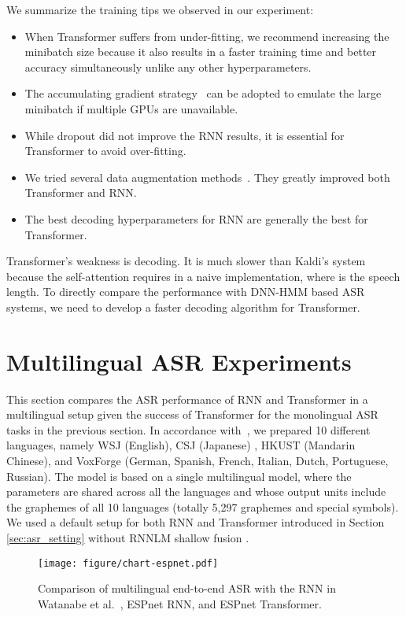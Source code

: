 We summarize the training tips we observed in our experiment:
{
\setlength{\leftmargini}{15pt}  
\begin{itemize}
	\setlength{\itemsep}{1pt}      \setlength{\parskip}{0pt}      \setlength{\itemindent}{0pt}   \setlength{\labelsep}{4pt}     \item When Transformer suffers from under-fitting, we recommend increasing the minibatch size because it also results in a faster training time and better accuracy simultaneously unlike any other hyperparameters.
    \item The accumulating gradient strategy~\cite{ott-etal-2018-scaling} can be adopted to emulate the large minibatch if multiple GPUs are unavailable.
\item While dropout did not improve the RNN results, it is essential for Transformer to avoid over-fitting.
    \item We tried several data augmentation methods~\cite{ko2015audio,park2019specaugment}. They greatly improved both Transformer and RNN.
\item The best decoding hyperparameters  for RNN are generally the best for Transformer.
\end{itemize}
}
Transformer's weakness is decoding. It is much slower than Kaldi's system because the self-attention requires  in a naive implementation, where  is the speech length. To directly compare the performance with DNN-HMM based ASR systems, we need to develop a faster decoding algorithm for Transformer.


\section{Multilingual ASR Experiments}
This section compares the ASR performance of RNN and Transformer in a multilingual setup given the success of Transformer for the monolingual ASR tasks in the previous section.
In accordance with~\cite{watanabe2017language}, we prepared 10 different languages, namely WSJ (English), CSJ (Japanese) \cite{CSJ-L00-1200}, HKUST \cite{hkust} (Mandarin Chinese), and VoxForge (German, Spanish, French, Italian, Dutch, Portuguese, Russian).
The model is based on a single multilingual model,  where the parameters
are shared across all the languages and whose output units include the graphemes of all 10 languages (totally 5,297 graphemes and special symbols).
We used a default setup for both RNN and Transformer introduced in Section \ref{sec:asr_setting} without RNNLM shallow fusion \cite{HoriWZC17}.
\begin{figure}[tb]
    \centering
    \vspace{-3mm}
    \texttt{[image: figure/chart-espnet.pdf]}
    \vspace{-6mm}
    \caption{Comparison of multilingual end-to-end ASR with the RNN in Watanabe et al.~\cite{watanabe2017language}, ESPnet RNN, and ESPnet Transformer.}
    \vspace{-2mm}
    \label{fig:li10}
\end{figure}

